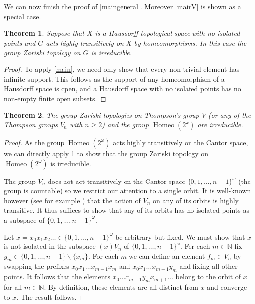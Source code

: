 \documentclass[11pt]{amsart}
\newtheorem{theorem}{Theorem}[section]
\newcommand{\N}{\mathbb N}
\begin{document}
We can now finish the proof of \cref{maingeneral}. 
Moreover \cref{mainV} is shown as a special case.

\begin{theorem}\label{topcor}
    Suppose that \(X\) is a Hausdorff topological space with no isolated points and \(G\) acts highly transitively on \(X\) by homeomorphisms.
    In this case the group Zariski topology on \(G\) is irreducible.
\end{theorem}
\begin{proof}
    To apply \cref{main}, we need only show that every non-trivial element has infinite support. 
    This follows as the support of any homeomorphism of a Hausdorff space is open, and a Hausdorff space with no isolated points has no non-empty finite open subsets.
\end{proof}

\begin{theorem}
    The group Zariski topologies on Thompson's group  \(V\) (or any of the Thompson groups \(V_n\) with \(n\geq 2\)) and the group \(\operatorname{Homeo}(2^\omega)\) are irreducible.
\end{theorem}
\begin{proof}
As the group \(\operatorname{Homeo}(2^\omega)\) acts highly transitively on the Cantor space, we can directly apply \cref{topcor} to show that the group Zariski topology on \(\operatorname{Homeo}(2^\omega)\) is irreducible. 

The group \(V_n\) does not act transitively on the Cantor space \(\{0,1,\ldots, n-1\}^\omega\) (the group is countable) so we restrict our attention to a single orbit. 
It is well-known however (see for example \cite{hightrans}) that the action of \(V_n\) on any of its orbits is highly transitive. It thus suffices to show that any of its orbits has no isolated points as a subspace of \(\{0,1,\ldots, n-1\}^\omega\). 

Let \(x=x_0x_1x_2\ldots \in \{0,1,\ldots, n-1\}^\omega\) be arbitrary but fixed.  We must show that \(x\) is not isolated in the subspace \((x)V_n\) of \(\{0,1,\ldots, n-1\}^\omega\). For each \(m\in \N\) fix \(y_m\in \{0,1,\ldots,n-1\}\backslash \{x_m\}\). For each \(m\) we can define an element \(f_m\in V_n\) by swapping the prefixes \(x_0x_1\ldots x_{m-1}x_m\) and \(x_0x_1\ldots x_{m-1}y_m\) and fixing all other points. 
It follows that the elements \(x_0\ldots x_{m-1}y_mx_{m+1}\ldots\) belong to the orbit of \(x\) for all \(m\in \N\). 
By definition, these elements are all distinct from \(x\) and converge to \(x\). The result follows.
\end{proof}
\end{document}
